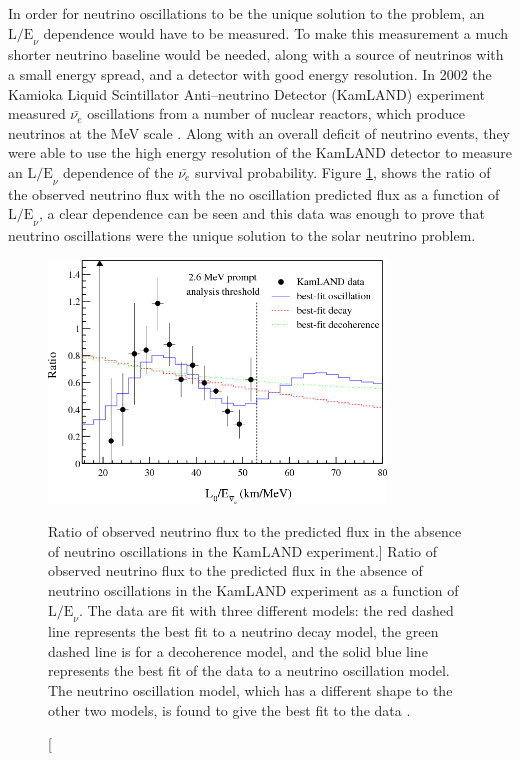 In order for neutrino oscillations to be the unique solution to the problem, 
an \(\mbox{L/E}_\nu\) dependence would have to be measured. To make this 
measurement a much shorter neutrino baseline would be needed, along with a 
source of neutrinos with a small energy spread, and a detector with good 
energy resolution. In 2002 the Kamioka Liquid Scintillator Anti--neutrino 
Detector (KamLAND) experiment measured \(\bar{\nu_e}\) oscillations from a 
number of nuclear reactors, which produce neutrinos at the MeV scale \cite{
	Eguchi2003, Araki2005}. Along with an overall deficit of neutrino events, 
they were able to use the high energy resolution of the KamLAND detector to 
measure an \(\mbox{L/E}_\nu\) dependence of the \(\bar{\nu_e}\) survival 
probability.  Figure \ref{fig:kamland_spectrum}, shows the ratio of the 
observed neutrino flux with the no oscillation predicted flux as a function of 
\(\mbox{L/E}_\nu\), a clear dependence can be seen and this data was enough to 
prove that neutrino oscillations were the unique solution to the solar 
neutrino problem.  
\begin{figure}

	\centering

	\includegraphics[width=0.8\textwidth]{figures/kamland_spec.png}

	\caption
	[Ratio of observed neutrino flux to the predicted flux in the absence of
	neutrino oscillations in the KamLAND experiment.]
	{Ratio of observed neutrino flux to the predicted flux in the absence of
	neutrino oscillations in the KamLAND experiment as a function of 
	\(\mbox{L/E}_\nu\). The data are fit with three different models: the red 
	dashed line represents the best fit to a neutrino decay model, the green 
	dashed line is for a decoherence model, and the solid blue line represents the 
	best fit of the data to a neutrino oscillation model. The neutrino oscillation
	model, which has a different shape to the other two models, is found to give 
	the best fit to the data \cite{Araki2005}.} 

	\label{fig:kamland_spectrum}

\end{figure}

